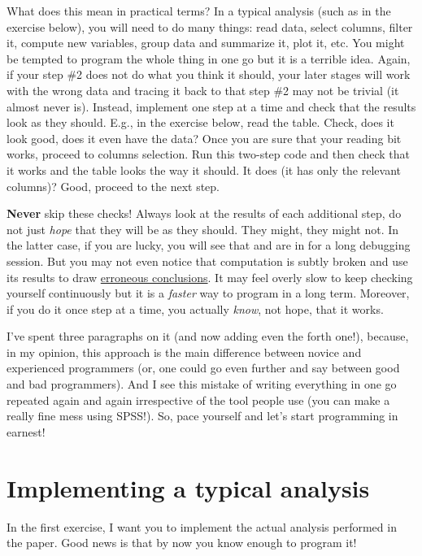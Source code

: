 \documentclass[
]{book}
\begin{document}
What does this mean in practical terms? In a typical analysis (such as in the exercise below), you will need to do many things: read data, select columns, filter it, compute new variables, group data and summarize it, plot it, etc. You might be tempted to program the whole thing in one go but it is a terrible idea. Again, if your step \#2 does not do what you think it should, your later stages will work with the wrong data and tracing it back to that step \#2 may not be trivial (it almost never is). Instead, implement one step at a time and check that the results look as they should. E.g., in the exercise below, read the table. Check, does it look good, does it even have the data? Once you are sure that your reading bit works, proceed to columns selection. Run this two-step code and then check that it works and the table looks the way it should. It does (it has only the relevant columns)? Good, proceed to the next step.

\textbf{Never} skip these checks! Always look at the results of each additional step, do not just \emph{hope} that they will be as they should. They might, they might not. In the latter case, if you are lucky, you will see that and are in for a long debugging session. But you may not even notice that computation is subtly broken and use its results to draw \href{https://www.powerusersoftwares.com/post/2016/08/11/the-excel-formula-error-that-initiated-austerity-policies-after-the-crisis}{erroneous conclusions}. It may feel overly slow to keep checking yourself continuously but it is a \emph{faster} way to program in a long term. Moreover, if you do it once step at a time, you actually \emph{know}, not hope, that it works.

I've spent three paragraphs on it (and now adding even the forth one!), because, in my opinion, this approach is the main difference between novice and experienced programmers (or, one could go even further and say between good and bad programmers). And I see this mistake of writing everything in one go repeated again and again irrespective of the tool people use (you can make a really fine mess using SPSS!). So, pace yourself and let's start programming in earnest!

\hypertarget{implementing-a-typical-analysis}{%
\section{Implementing a typical analysis}\label{implementing-a-typical-analysis}}

In the first exercise, I want you to implement the actual analysis performed in the paper. Good news is that by now you know enough to program it!
\end{document}
